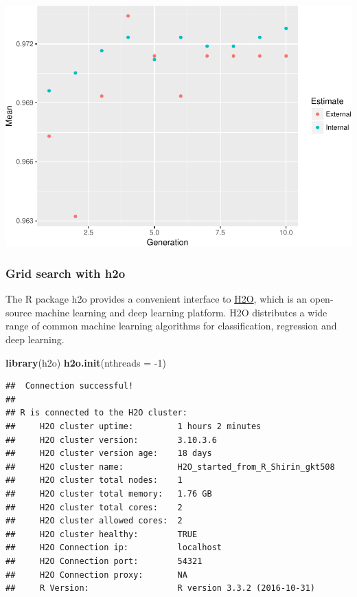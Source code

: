 \documentclass[]{article}
\newenvironment{Shaded}{\begin{snugshade}}{\end{snugshade}}
\newcommand{\KeywordTok}[1]{\textcolor[rgb]{0.13,0.29,0.53}{\textbf{{#1}}}}
\newcommand{\DataTypeTok}[1]{\textcolor[rgb]{0.13,0.29,0.53}{{#1}}}
\newcommand{\DecValTok}[1]{\textcolor[rgb]{0.00,0.00,0.81}{{#1}}}
\newcommand{\StringTok}[1]{\textcolor[rgb]{0.31,0.60,0.02}{{#1}}}
\newcommand{\NormalTok}[1]{{#1}}
\begin{document}
\includegraphics{webinar_code_files/figure-latex/unnamed-chunk-32-1.pdf}

\begin{Shaded}
\end{Shaded}

\subsubsection{Grid search with h2o}\label{grid-search-with-h2o}

The R package h2o provides a convenient interface to
\href{http://www.h2o.ai/h2o/}{H2O}, which is an open-source machine
learning and deep learning platform. H2O distributes a wide range of
common machine learning algorithms for classification, regression and
deep learning.

\begin{Shaded}
\begin{Highlighting}[]
\KeywordTok{library}\NormalTok{(h2o)}
\KeywordTok{h2o.init}\NormalTok{(}\DataTypeTok{nthreads =} \NormalTok{-}\DecValTok{1}\NormalTok{)}
\end{Highlighting}
\end{Shaded}

\begin{verbatim}
##  Connection successful!
## 
## R is connected to the H2O cluster: 
##     H2O cluster uptime:         1 hours 2 minutes 
##     H2O cluster version:        3.10.3.6 
##     H2O cluster version age:    18 days  
##     H2O cluster name:           H2O_started_from_R_Shirin_gkt508 
##     H2O cluster total nodes:    1 
##     H2O cluster total memory:   1.76 GB 
##     H2O cluster total cores:    2 
##     H2O cluster allowed cores:  2 
##     H2O cluster healthy:        TRUE 
##     H2O Connection ip:          localhost 
##     H2O Connection port:        54321 
##     H2O Connection proxy:       NA 
##     R Version:                  R version 3.3.2 (2016-10-31)
\end{verbatim}
\end{document}

